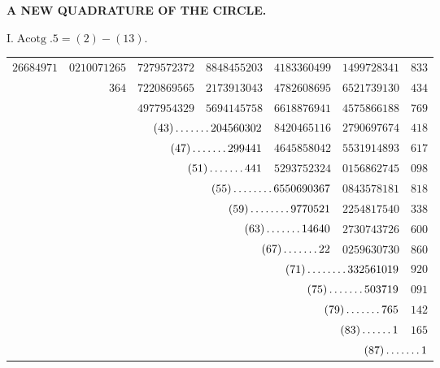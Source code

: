 \clearpage
\renewcommand{\BookRunningTitle}{A New Quadrature of the Circle}
%
\begin{center}\textbf{A NEW QUADRATURE OF THE CIRCLE.}\end{center}
\begin{center}I.\quad $\operatorname{Acotg}.5=(2)-(13).$\end{center}
\begingroup\fontsize{8.5}{11}\selectfont\setlength{\tabcolsep}{2pt}
\begin{longtable}{@{}rrrrrrr@{}}
\hline
$26684971$ & $0210071265$ & $7279572372$ & $8848455203$ & $4183360499$ & $1499728341$ & $833$\\
 & $364$ & $7220869565$ & $2173913043$ & $4782608695$ & $6521739130$ & $434$\\
 &  & $4977954329$ & $5694145758$ & $6618876941$ & $4575866188$ & $769$\\
 &  & \multicolumn{2}{r}{$(43)\mathinner{.\,.\,.\,.\,.\,.\,.}204560302$} & $8420465116$ & $2790697674$ & $418$\\
 &  & \multicolumn{2}{r}{$(47)\mathinner{.\,.\,.\,.\,.\,.\,.}299441$} & $4645858042$ & $5531914893$ & $617$\\
 &  & \multicolumn{2}{r}{$(51)\mathinner{.\,.\,.\,.\,.\,.\,.}441$} & $5293752324$ & $0156862745$ & $098$\\
 &  &  & \multicolumn{2}{r}{$(55)\mathinner{.\,.\,.\,.\,.\,.\,.\,.}6550690367$} & $0843578181$ & $818$\\
 &  &  & \multicolumn{2}{r}{$(59)\mathinner{.\,.\,.\,.\,.\,.\,.\,.}9770521$} & $2254817540$ & $338$\\
 &  &  & \multicolumn{2}{r}{$(63)\mathinner{.\,.\,.\,.\,.\,.\,.}14640$} & $2730743726$ & $600$\\
 &  &  & \multicolumn{2}{r}{$(67)\mathinner{.\,.\,.\,.\,.\,.\,.}22$} & $0259630730$ & $860$\\
 &  &  &  & \multicolumn{2}{r}{$(71)\mathinner{.\,.\,.\,.\,.\,.\,.\,.}332561019$} & $920$\\
 &  &  &  & \multicolumn{2}{r}{$(75)\mathinner{.\,.\,.\,.\,.\,.\,.}503719$} & $091$\\
 &  &  &  & \multicolumn{2}{r}{$(79)\mathinner{.\,.\,.\,.\,.\,.\,.}765$} & $142$\\
 &  &  &  & \multicolumn{2}{r}{$(83)\mathinner{.\,.\,.\,.\,.\,.}1$} & $165$\\
 &  &  &  &  & \multicolumn{2}{r}{$(87)\mathinner{.\,.\,.\,.\,.\,.\,.}1$}\\

\end{longtable}
